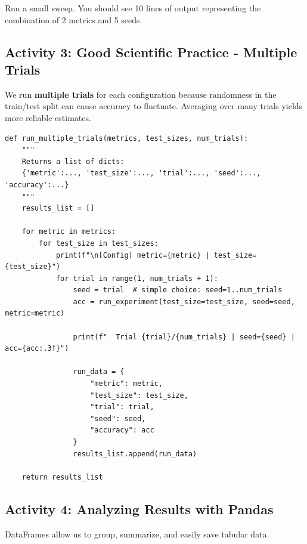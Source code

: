\begin{tcolorbox}[title=Checkpoint]
Run a small sweep. You should see 10 lines of output representing the combination of 2 metrics and 5 seeds.
\end{tcolorbox}

\newpage
\subsection{Activity 3: Good Scientific Practice - Multiple Trials}

We run \textbf{multiple trials} for each configuration because randomness in the train/test split can cause accuracy to fluctuate. Averaging over many trials yields more reliable estimates.

\begin{tcolorbox}[title=Do: Implement \texttt{run\_multiple\_trials}]
\begin{verbatim}
def run_multiple_trials(metrics, test_sizes, num_trials):
    """
    Returns a list of dicts:
    {'metric':..., 'test_size':..., 'trial':..., 'seed':..., 'accuracy':...}
    """
    results_list = []

    for metric in metrics:
        for test_size in test_sizes:
            print(f"\n[Config] metric={metric} | test_size={test_size}")
            for trial in range(1, num_trials + 1):
                seed = trial  # simple choice: seed=1..num_trials
                acc = run_experiment(test_size=test_size, seed=seed, metric=metric)

                print(f"  Trial {trial}/{num_trials} | seed={seed} | acc={acc:.3f}")

                run_data = {
                    "metric": metric,
                    "test_size": test_size,
                    "trial": trial,
                    "seed": seed,
                    "accuracy": acc
                }
                results_list.append(run_data)

    return results_list
\end{verbatim}
\end{tcolorbox}

\newpage
\subsection{Activity 4: Analyzing Results with Pandas}

DataFrames allow us to group, summarize, and easily save tabular data.

